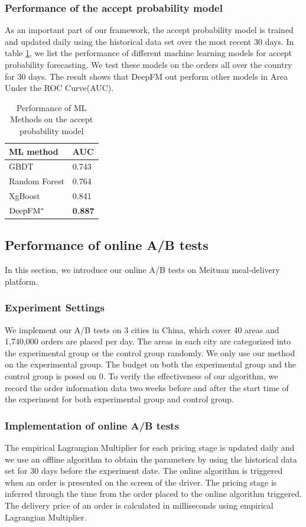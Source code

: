 \documentclass[sigconf,authordraft]{acmart}
\begin{document}
\subsubsection{Performance of the accept probability model}
As an important part of our framework, the accept probability model is trained and updated daily using the historical data set over the most recent 30 days. In table \ref{tab:eva-model}, we list the performance of different machine learning models for accept probability forecasting. We test these models on the orders all over the country for 30 days. The result shows that DeepFM out perform other models in Area Under the ROC Curve(AUC).
\begin{table}[t]
\caption{Performance of ML Methods on the accept probability model}
\label{tab:eva-model}
\begin{tabular}{l|l}
\toprule
ML method     & AUC   \\
\midrule
GBDT          & 0.743 \\
Random Forest & 0.764 \\
XgBoost       & 0.841 \\
${\rm DeepFM^*}$        & \textbf{0.887}\\
\bottomrule 
\end{tabular}
\end{table}

\subsection{Performance of online A/B tests}
In this section, we introduce our online A/B tests on Meituan meal-delivery platform. 
\subsubsection{Experiment Settings}

We implement our A/B tests on 3 cities in China, which cover 40 areas and 1,740,000 orders are placed per day. The areas in each city are categorized into the experimental group or the control group randomly. We only use our method on the experimental group. The budget on both the experimental group and the control group is posed on 0. To verify the effectiveness of our algorithm, we record the order information data two weeks before and after the start time of the experiment for both experimental group and control group. 

\subsubsection{Implementation of online A/B tests}
The empirical Lagrangian Multiplier for each pricing stage is updated daily and we use an offline algorithm to obtain the parameters by using the historical data set for 30 days before the experiment date. The online algorithm is triggered when an order is presented on the screen of the driver. The pricing stage is inferred through the time from the order placed to the online algorithm triggered. The delivery price of an order is calculated in milliseconds using empirical Lagrangian Multiplier. 
\end{document}
